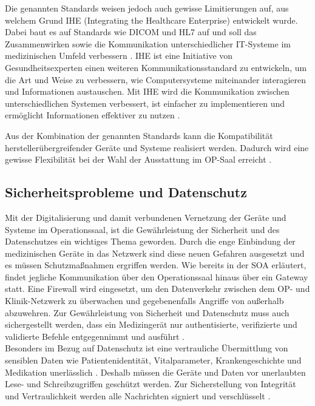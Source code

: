 Die genannten Standards weisen jedoch auch gewisse Limitierungen auf, aus welchem Grund IHE (Integrating the Healthcare Enterprise) entwickelt wurde. Dabei baut es auf Standards wie DICOM und HL7 auf und soll das Zusammenwirken sowie die Kommunikation unterschiedlicher IT-Systeme im medizinischen Umfeld verbessern \cite{DICOMundIHE}. 
IHE ist eine Initiative von Gesundheitsexperten einen weiteren Kommunikationsstandard zu entwickeln, um die Art und Weise zu verbessern, wie Computersysteme miteinander interagieren und Informationen austauschen. Mit IHE wird die Kommunikation zwischen unterschiedlichen Systemen verbessert, ist einfacher zu implementieren und ermöglicht Informationen effektiver zu nutzen \cite{IHE}.

Aus der Kombination der genannten Standards kann die Kompatibilität herstellerübergreifender Geräte und Systeme realisiert werden. Dadurch wird eine gewisse Flexibilität bei der Wahl der Ausstattung im OP-Saal erreicht \cite{DerDigitaleOperationssaal}.

\subsection{Sicherheitsprobleme und Datenschutz}

Mit der Digitalisierung und damit verbundenen Vernetzung der Geräte und Systeme im Operationssaal, ist die Gewährleistung der Sicherheit und des Datenschutzes ein wichtiges Thema geworden.
Durch die enge Einbindung der medizinischen Geräte in das Netzwerk sind diese neuen Gefahren ausgesetzt und es müssen Schutzmaßnahmen ergriffen werden. Wie bereits in der SOA erläutert, findet jegliche Kommunikation über den Operationssaal hinaus über ein Gateway statt. Eine Firewall wird eingesetzt, um den Datenverkehr zwischen dem OP- und Klinik-Netzwerk zu überwachen und gegebenenfalls Angriffe von außerhalb abzuwehren. Zur Gewährleistung von Sicherheit und Datenschutz muss auch sichergestellt werden, dass \glqq ein Medizingerät nur authentisierte, verifizierte und validierte Befehle entgegennimmt und ausführt\grqq{} \cite{DerDigitaleOperationssaal}. \\
Besonders im Bezug auf Datenschutz ist eine \glqq vertrauliche Übermittlung von sensiblen Daten wie Patientenidentität, Vitalparameter, Krankengeschichte und Medikation unerlässlich\grqq{} \cite{DerDigitaleOperationssaal}. Deshalb müssen die Geräte und Daten vor unerlaubten Lese- und Schreibzugriffen geschützt werden. Zur Sicherstellung von Integrität und Vertraulichkeit werden alle Nachrichten signiert und verschlüsselt \cite{DerDigitaleOperationssaal}. 

